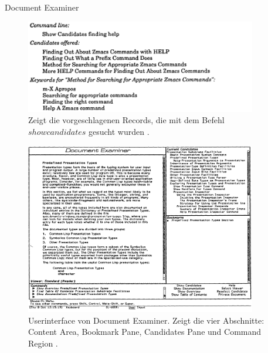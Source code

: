 \begin{section}{Document Examiner}
\begin{figure}[!ht]
	\centering
	\includegraphics[width=0.9\textwidth]{image/candidates}
	\caption{Zeigt die vorgeschlagenen Records, die mit dem Befehl $show candidates$ gesucht wurden \cite{Walker1987}.}
	\label{fig:candidates}
\end{figure}

\begin{figure}[!ht]
	\centering
	\includegraphics[width=0.9\textwidth]{image/document}
	\caption{Userinterface von Document Examiner. Zeigt die vier Abschnitte: Content Area, Bookmark Pane, Candidates Pane und Command Region \cite{Walker1987}.}
	\label{fig:ducument}
\end{figure}


\end{section}
